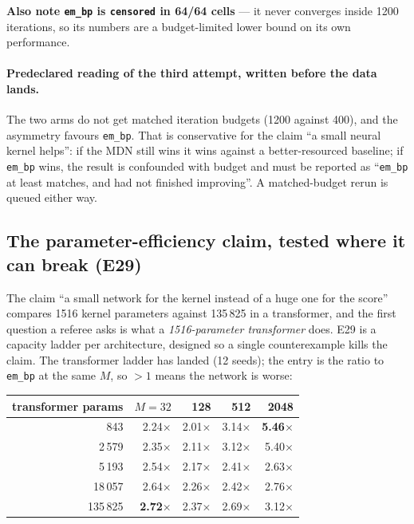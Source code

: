 \documentclass[10pt,a4paper]{article}
\newcommand{\nseq}{M}
\newcommand{\code}[1]{\texttt{\small #1}}
\newcommand{\st}[1]{\textbf{#1}}
\begin{document}
\st{Also note \code{em\_bp} is \code{censored} in 64/64 cells} --- it never converges inside 1200
iterations, so its numbers are a budget-limited lower bound on its own performance.

\paragraph{Predeclared reading of the third attempt, written before the data lands.} The two
arms do not get matched iteration budgets (1200 against 400), and the asymmetry favours
\code{em\_bp}. That is conservative for the claim ``a small neural kernel helps'': if the MDN
still wins it wins against a better-resourced baseline; if \code{em\_bp} wins, the result is
confounded with budget and must be reported as ``\code{em\_bp} at least matches, and had not
finished improving''. A matched-budget rerun is queued either way.

\subsection{The parameter-efficiency claim, tested where it can break (E29)}

The claim ``a small network for the kernel instead of a huge one for the score'' compares 1516
kernel parameters against 135\,825 in a transformer, and the first question a referee asks is
what a \emph{1516-parameter transformer} does. E29 is a capacity ladder per architecture,
designed so a single counterexample kills the claim. The transformer ladder has landed (12
seeds); the entry is the ratio to \code{em\_bp} at the same $\nseq$, so $>1$ means the network is
worse:

\medskip
\noindent\begin{tabular}{@{}r rrrr@{}}
\toprule
transformer params & $\nseq=32$ & 128 & 512 & 2048 \\
\midrule
843 & 2.24$\times$ & 2.01$\times$ & 3.14$\times$ & \st{5.46$\times$} \\
2\,579 & 2.35$\times$ & 2.11$\times$ & 3.12$\times$ & 5.40$\times$ \\
5\,193 & 2.54$\times$ & 2.17$\times$ & 2.41$\times$ & 2.63$\times$ \\
18\,057 & 2.64$\times$ & 2.26$\times$ & 2.42$\times$ & 2.76$\times$ \\
135\,825 & \st{2.72$\times$} & 2.37$\times$ & 2.69$\times$ & 3.12$\times$ \\
\bottomrule
\end{tabular}
\end{document}
